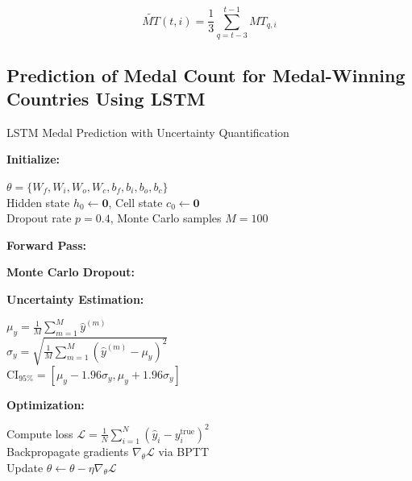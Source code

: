 \documentclass{mcmthesis}
\begin{document}
	\[
	\widetilde{MT}(t,i) = \frac{1}{3} \sum_{q=t-3}^{t-1} MT_{q,i}
	\]
	
	
	\subsection{Prediction of Medal Count for Medal-Winning Countries Using LSTM}
	
\begin{algorithm}
	\caption{LSTM Medal Prediction with Uncertainty Quantification}
	\label{alg:lstm_mc}
	
	\textbf{Initialize:}
	\begin{vlined}
		$\theta = \{W_f, W_i, W_o, W_c, b_f, b_i, b_o, b_c\}$ \\
		Hidden state $h_0 \gets \mathbf{0}$, Cell state $c_0 \gets \mathbf{0}$ \\
		Dropout rate $p=0.4$, Monte Carlo samples $M=100$
	\end{vlined}
	
	\textbf{Forward Pass:} 
	
	\textbf{Monte Carlo Dropout:}
	
	\textbf{Uncertainty Estimation:}
	\begin{vlined}
		$\mu_y = \frac{1}{M}\sum_{m=1}^M \hat{y}^{(m)}$  \\
		$\sigma_y = \sqrt{\frac{1}{M}\sum_{m=1}^M (\hat{y}^{(m)}-\mu_y)^2}$  \\
		$\text{CI}_{95\%} = [\mu_y - 1.96\sigma_y, \mu_y + 1.96\sigma_y]$
	\end{vlined}
	
	\textbf{Optimization:}
	\begin{vlined}
		Compute loss $\mathcal{L} = \frac{1}{N}\sum_{i=1}^N (\hat{y}_i - y_i^{\text{true}})^2$ \\
		Backpropagate gradients $\nabla_\theta\mathcal{L}$ via BPTT \\
		Update $\theta \gets \theta - \eta\nabla_\theta\mathcal{L}$ \tcp{$\eta$: learning rate}
	\end{vlined}
	
\end{algorithm}
\end{document}
